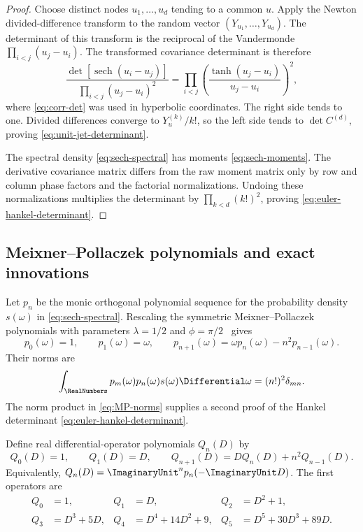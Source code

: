 \documentclass[11pt,a4paper]{article}
\theoremstyle{definition}
\theoremstyle{remark}
\newcommand{\sech}{\operatorname{sech}}
\begin{document}
\begin{proof}
Choose distinct nodes $u_1,\ldots,u_d$ tending to a common $u$.  Apply the Newton divided-difference transform to the random vector $(Y_{u_1},\ldots,Y_{u_d})$.  The determinant of this transform is the reciprocal of the Vandermonde $\prod_{i<j}(u_j-u_i)$.  The transformed covariance determinant is therefore
\begin{equation}
 \frac{\det[\sech(u_i-u_j)]}
      {\prod_{i<j}(u_j-u_i)^2}
 =\prod_{i<j}
   \left(\frac{\tanh(u_j-u_i)}{u_j-u_i}\right)^2,
 \label{eq:confluent-sech-det}
\end{equation}
where \eqref{eq:corr-det} was used in hyperbolic coordinates.  The right side tends to one.  Divided differences converge to $Y_u^{(k)}/k!$, so the left side tends to $\det C^{(d)}$, proving \eqref{eq:unit-jet-determinant}.

The spectral density \eqref{eq:sech-spectral} has moments \eqref{eq:sech-moments}.  The derivative covariance matrix differs from the raw moment matrix only by row and column phase factors and the factorial normalizations.  Undoing these normalizations multiplies the determinant by $\prod_{k<d}(k!)^2$, proving \eqref{eq:euler-hankel-determinant}.
\end{proof}

\subsection{Meixner--Pollaczek polynomials and exact innovations}

Let $p_n$ be the monic orthogonal polynomial sequence for the probability density $s(\omega)$ in \eqref{eq:sech-spectral}.  Rescaling the symmetric Meixner--Pollaczek polynomials with parameters $\lambda=1/2$ and $\phi=\pi/2$~\cite{Koekoek} gives
\begin{equation}
  p_0(\omega)=1,
  \qquad p_1(\omega)=\omega,
  \qquad
  p_{n+1}(\omega)=\omega p_n(\omega)-n^2p_{n-1}(\omega).
  \label{eq:MP-recurrence}
\end{equation}
Their norms are
\begin{equation}
  \int_{\RealNumbers}p_m(\omega)p_n(\omega)s(\omega)\Differential\omega
   =(n!)^2\delta_{mn}.
  \label{eq:MP-norms}
\end{equation}
The norm product in \eqref{eq:MP-norms} supplies a second proof of the Hankel determinant \eqref{eq:euler-hankel-determinant}.

Define real differential-operator polynomials $Q_n(D)$ by
\begin{equation}
  Q_0(D)=1,
  \qquad Q_1(D)=D,
  \qquad Q_{n+1}(D)=DQ_n(D)+n^2Q_{n-1}(D).
  \label{eq:Q-recurrence}
\end{equation}
Equivalently, $Q_n(D)=\ImaginaryUnit^np_n(-\ImaginaryUnit D)$.  The first operators are
\begin{align}
 Q_0&=1,&
 Q_1&=D,&
 Q_2&=D^2+1,\\
 Q_3&=D^3+5D,&
 Q_4&=D^4+14D^2+9,&
 Q_5&=D^5+30D^3+89D.
 \label{eq:first-Q}
\end{align}
\end{document}
